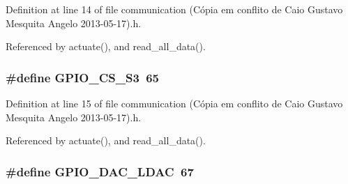Definition at line 14 of file communication (\-Cópia em conflito de Caio Gustavo Mesquita Angelo 2013-\/05-\/17).\-h.



Referenced by actuate(), and read\-\_\-all\-\_\-data().

\hypertarget{communication_01_07C_xC3_xB3pia_01em_01conflito_01de_01Caio_01Gustavo_01Mesquita_01Angelo_012013-05-17_08_8h_ad774f00fc71216488e24a803bf4eb6aa}{
\subsubsection[{G\-P\-I\-O\-\_\-\-C\-S\-\_\-\-S3}]{\setlength{\rightskip}{0pt plus 5cm}\#define G\-P\-I\-O\-\_\-\-C\-S\-\_\-\-S3~65}}\label{communication_01_07C_xC3_xB3pia_01em_01conflito_01de_01Caio_01Gustavo_01Mesquita_01Angelo_012013-05-17_08_8h_ad774f00fc71216488e24a803bf4eb6aa}


Definition at line 15 of file communication (\-Cópia em conflito de Caio Gustavo Mesquita Angelo 2013-\/05-\/17).\-h.



Referenced by actuate(), and read\-\_\-all\-\_\-data().

\hypertarget{communication_01_07C_xC3_xB3pia_01em_01conflito_01de_01Caio_01Gustavo_01Mesquita_01Angelo_012013-05-17_08_8h_a014b45373b6ab21c681fc378bd8203f9}{
\subsubsection[{G\-P\-I\-O\-\_\-\-D\-A\-C\-\_\-\-L\-D\-A\-C}]{\setlength{\rightskip}{0pt plus 5cm}\#define G\-P\-I\-O\-\_\-\-D\-A\-C\-\_\-\-L\-D\-A\-C~67}}\label{communication_01_07C_xC3_xB3pia_01em_01conflito_01de_01Caio_01Gustavo_01Mesquita_01Angelo_012013-05-17_08_8h_a014b45373b6ab21c681fc378bd8203f9}


